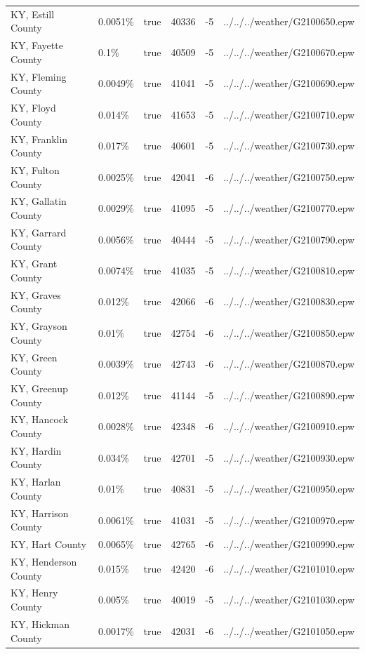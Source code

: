 \begin{longtable}[]{@{}llllll@{}}
KY, Estill County & 0.0051\% & true & 40336 & -5 &
../../../weather/G2100650.epw \\
KY, Fayette County & 0.1\% & true & 40509 & -5 &
../../../weather/G2100670.epw \\
KY, Fleming County & 0.0049\% & true & 41041 & -5 &
../../../weather/G2100690.epw \\
KY, Floyd County & 0.014\% & true & 41653 & -5 &
../../../weather/G2100710.epw \\
KY, Franklin County & 0.017\% & true & 40601 & -5 &
../../../weather/G2100730.epw \\
KY, Fulton County & 0.0025\% & true & 42041 & -6 &
../../../weather/G2100750.epw \\
KY, Gallatin County & 0.0029\% & true & 41095 & -5 &
../../../weather/G2100770.epw \\
KY, Garrard County & 0.0056\% & true & 40444 & -5 &
../../../weather/G2100790.epw \\
KY, Grant County & 0.0074\% & true & 41035 & -5 &
../../../weather/G2100810.epw \\
KY, Graves County & 0.012\% & true & 42066 & -6 &
../../../weather/G2100830.epw \\
KY, Grayson County & 0.01\% & true & 42754 & -6 &
../../../weather/G2100850.epw \\
KY, Green County & 0.0039\% & true & 42743 & -6 &
../../../weather/G2100870.epw \\
KY, Greenup County & 0.012\% & true & 41144 & -5 &
../../../weather/G2100890.epw \\
KY, Hancock County & 0.0028\% & true & 42348 & -6 &
../../../weather/G2100910.epw \\
KY, Hardin County & 0.034\% & true & 42701 & -5 &
../../../weather/G2100930.epw \\
KY, Harlan County & 0.01\% & true & 40831 & -5 &
../../../weather/G2100950.epw \\
KY, Harrison County & 0.0061\% & true & 41031 & -5 &
../../../weather/G2100970.epw \\
KY, Hart County & 0.0065\% & true & 42765 & -6 &
../../../weather/G2100990.epw \\
KY, Henderson County & 0.015\% & true & 42420 & -6 &
../../../weather/G2101010.epw \\
KY, Henry County & 0.005\% & true & 40019 & -5 &
../../../weather/G2101030.epw \\
KY, Hickman County & 0.0017\% & true & 42031 & -6 &
../../../weather/G2101050.epw \\

\end{longtable}
